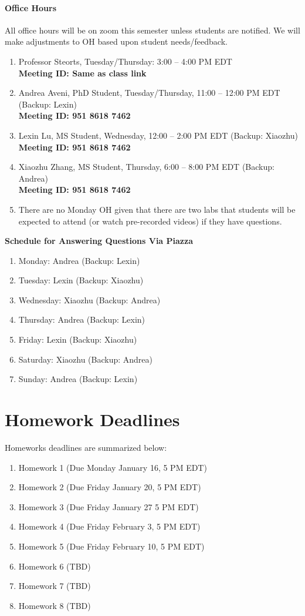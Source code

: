 \documentclass[11pt]{article}
\begin{document}
\paragraph{Office Hours}
All office hours will be on zoom this semester unless students are notified. We will make adjustments to OH based upon student needs/feedback. 
\begin{enumerate}
\item Professor Steorts, Tuesday/Thursday: 3:00 -- 4:00 PM EDT\\
\textbf{Meeting ID: Same as class link}
\item Andrea Aveni, PhD Student, Tuesday/Thursday, 11:00 -- 12:00 PM EDT (Backup: Lexin)\\
\textbf{Meeting ID: 951 8618 7462}
\item Lexin Lu, MS Student, Wednesday, 12:00 -- 2:00 PM EDT  (Backup: Xiaozhu)\\
\textbf{Meeting ID: 951 8618 7462}
\item Xiaozhu Zhang, MS Student, Thursday, 6:00 -- 8:00 PM EDT (Backup: Andrea)\\
\textbf{Meeting ID: 951 8618 7462}
\item There are no Monday OH given that there are two labs that students will be expected to attend (or watch pre-recorded videos) if they have questions. 
\end{enumerate}


\textbf{Schedule for Answering Questions Via Piazza}
\begin{enumerate}
\item Monday: Andrea (Backup: Lexin)
\item Tuesday: Lexin (Backup: Xiaozhu)
\item Wednesday: Xiaozhu (Backup: Andrea)
\item Thursday: Andrea (Backup: Lexin)
\item Friday: Lexin (Backup: Xiaozhu)
\item Saturday: Xiaozhu (Backup: Andrea)
\item Sunday: Andrea (Backup: Lexin)
\end{enumerate}



\section{Homework Deadlines}
Homeworks deadlines are summarized below:

\begin{enumerate}
\item Homework 1 (Due Monday January 16, 5 PM EDT)
\item Homework 2 (Due Friday January 20, 5 PM EDT)
\item Homework 3 (Due Friday January 27 5 PM EDT)
\item Homework 4 (Due Friday February 3, 5 PM EDT)
\item Homework 5 (Due Friday February 10, 5 PM EDT)
\item Homework 6 (TBD)
\item Homework 7 (TBD)
\item Homework 8 (TBD)
\end{enumerate} 
\end{document}
